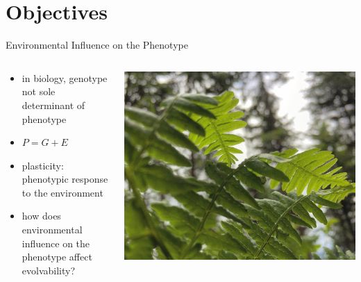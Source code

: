 \section{Objectives}

\begin{frame}{Environmental Influence on the Phenotype}
  \begin{columns}
\begin{column}{0.6\textwidth}
\begin{itemize}
	\item in biology, genotype not sole determinant of phenotype
    \item $P = G + E$
    \item plasticity: phenotypic response to the environment
    \item how does environmental influence on the phenotype affect evolvability?
\end{itemize}
\end{column}
\begin{column}{0.4\textwidth}
\begin{center}
\includegraphics[width=\textwidth,trim={12cm 0 6cm 0},clip]{img/bent_fern}
\end{center}
\end{column}
\end{columns}
\end{frame}

